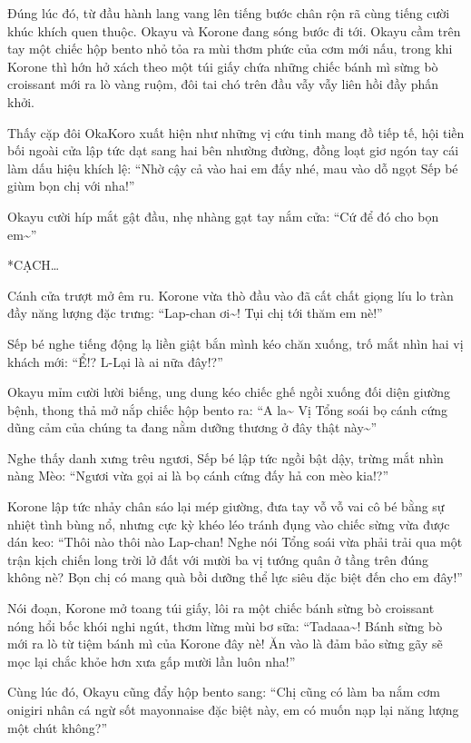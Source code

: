 \documentclass[../main.tex]{subfiles}
\begin{document}
Đúng lúc đó, từ đầu hành lang vang lên tiếng bước chân rộn rã cùng tiếng cười khúc khích quen thuộc. Okayu và Korone đang sóng bước đi tới. Okayu cầm trên tay một chiếc hộp bento nhỏ tỏa ra mùi thơm phức của cơm mới nấu, trong khi Korone thì hớn hở xách theo một túi giấy chứa những chiếc bánh mì sừng bò croissant mới ra lò vàng ruộm, đôi tai chó trên đầu vẫy vẫy liên hồi đầy phấn khởi.

Thấy cặp đôi OkaKoro xuất hiện như những vị cứu tinh mang đồ tiếp tế, hội tiền bối ngoài cửa lập tức dạt sang hai bên nhường đường, đồng loạt giơ ngón tay cái làm dấu hiệu khích lệ: ``Nhờ cậy cả vào hai em đấy nhé, mau vào dỗ ngọt Sếp bé giùm bọn chị với nha!''

Okayu cười híp mắt gật đầu, nhẹ nhàng gạt tay nắm cửa: ``Cứ để đó cho bọn em\~{}''

*CẠCH\dots*

Cánh cửa trượt mở êm ru. Korone vừa thò đầu vào đã cất chất giọng líu lo tràn đầy năng lượng đặc trưng: ``Lap-chan ơi\~{}! Tụi chị tới thăm em nè!''

Sếp bé nghe tiếng động lạ liền giật bắn mình kéo chăn xuống, trố mắt nhìn hai vị khách mới: ``Ể!? L-Lại là ai nữa đây!?''

Okayu mỉm cười lười biếng, ung dung kéo chiếc ghế ngồi xuống đối diện giường bệnh, thong thả mở nắp chiếc hộp bento ra: ``A la\~{} Vị Tổng soái bọ cánh cứng dũng cảm của chúng ta đang nằm dưỡng thương ở đây thật này\~{}''

Nghe thấy danh xưng trêu ngươi, Sếp bé lập tức ngồi bật dậy, trừng mắt nhìn nàng Mèo: ``Ngươi vừa gọi ai là bọ cánh cứng đấy hả con mèo kia!?''

Korone lập tức nhảy chân sáo lại mép giường, đưa tay vỗ vỗ vai cô bé bằng sự nhiệt tình bùng nổ, nhưng cực kỳ khéo léo tránh đụng vào chiếc sừng vừa được dán keo: ``Thôi nào thôi nào Lap-chan! Nghe nói Tổng soái vừa phải trải qua một trận kịch chiến long trời lở đất với mười ba vị tướng quân ở tầng trên đúng không nè? Bọn chị có mang quà bồi dưỡng thể lực siêu đặc biệt đến cho em đây!''

Nói đoạn, Korone mở toang túi giấy, lôi ra một chiếc bánh sừng bò croissant nóng hổi bốc khói nghi ngút, thơm lừng mùi bơ sữa: ``Tadaaa\~{}! Bánh sừng bò mới ra lò từ tiệm bánh mì của Korone đây nè! Ăn vào là đảm bảo sừng gãy sẽ mọc lại chắc khỏe hơn xưa gấp mười lần luôn nha!''

Cùng lúc đó, Okayu cũng đẩy hộp bento sang: ``Chị cũng có làm ba nắm cơm onigiri nhân cá ngừ sốt mayonnaise đặc biệt này, em có muốn nạp lại năng lượng một chút không?''
\end{document}
